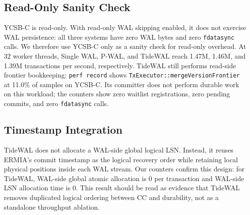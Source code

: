 \subsection{Read-Only Sanity Check}
\label{sec:evaluation-readonly}

YCSB-C is read-only.  With read-only WAL skipping enabled, it does not exercise
WAL persistence: all three systems have zero WAL bytes and zero
\texttt{fdatasync} calls.  We therefore use YCSB-C only as a sanity check for
read-only overhead.  At 32 worker threads, Single WAL, P-WAL, and TideWAL reach
1.47M, 1.46M, and 1.39M transactions per second, respectively.  TideWAL still
performs read-side frontier bookkeeping: \texttt{perf record} shows
\texttt{TxExecutor::mergeVersionFrontier} at 11.0\% of samples on YCSB-C.  Its
committer does not perform durable work on this workload; the counters show zero
waitlist registrations, zero pending commits, and zero \texttt{fdatasync}
calls.

\subsection{Timestamp Integration}
\label{sec:evaluation-timestamp}

TideWAL does not allocate a WAL-side global logical LSN.  Instead, it reuses
ERMIA's commit timestamp as the logical recovery order while retaining local
physical positions inside each WAL stream.  Our counters confirm this design:
for TideWAL, WAL-side global atomic allocation is 0 per transaction and
WAL-side LSN allocation time is 0.  This result should be read as evidence that
TideWAL removes duplicated logical ordering between CC and durability, not as a
standalone throughput ablation.
